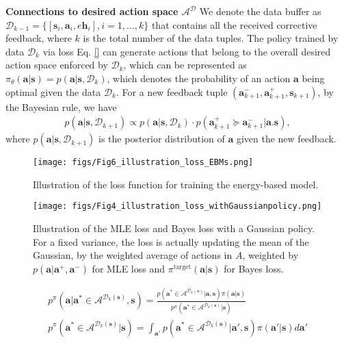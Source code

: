\textbf{Connections to desired action space $\mathcal{A}^{\mathcal{D}}$}
We denote the data buffer as $\mathcal{D}_{k-1} = \{[\bm s_i, \bm a_i, e \bm h_i], i = 1, \dots, k \}$ that contains all the received corrective feedback, where $k$ is the total number of the data tuples. 
The policy trained by data $\mathcal{D}_{k}$ 
 via loss Eq. \eqref{} can generate actions that belong to the overall desired action space enforced by $\mathcal{D}_{k}$, which can be represented as $ \pi_{\theta}(\bm a | \bm s) =p (\bm a | \bm s, \mathcal{D}_{k})$, which denotes the probability of an action $\bm a$ being optimal given the data $ \mathcal{D}_{k}$.
For a new feedback tuple $(\bm a^-_{k+1}, \bm a^+_{k+1}, \bm s_{k+1})$, by the Bayesian rule, we have
\begin{align}
    p (\bm a | \bm s, \mathcal{D}_{k+1}) \propto p (\bm a | \bm s, \mathcal{D}_{k}) \cdot p( \bm a^{+}_{k+1} \succeq \bm a^{-}_{k+1} | \bm a. \bm s),
\end{align}
where $p (\bm a | \bm s, \mathcal{D}_{k+1})$ is the posterior distribution of $\bm a$ given the new feedback. 


\begin{figure}
    \centering
    \texttt{[image: figs/Fig6\_illustration\_loss\_EBMs.png]}
	\caption{Illustration of the loss function for training the energy-based model.}
 \label{fig:Fig6_illustration_loss_EBMs}
\end{figure}


\begin{figure}
    \centering
    \texttt{[image: figs/Fig4\_illustration\_loss\_withGaussianpolicy.png]}
	\caption{Illustration of the MLE loss and Bayes loss with a Gaussian policy. For a fixed variance, the loss is actually updating the mean of the Gaussian, by the weighted average of actions in $A$, weighted by $p (\bm a|\bm a^{+},  \bm a^{-})$ for MLE loss and $\pi^{\text{target}}(\bm a | \bm s)$  for Bayes loss. }
 \label{fig:Fig4_illustration_loss_withGaussianpolicy}
\end{figure}


\begin{align}
p^{\pi} ( \bm a |  \bm a^* \in \mathcal{A}^{\mathcal{D}_k(\bm s)},  \bm s) =\frac{ p (\bm a^* \in \mathcal{A}^{\mathcal{D}_k(\bm s)} | \bm a ,\bm s) \pi(\bm a | \bm s)}{p^\pi (\bm a^* \in \mathcal{A}^{\mathcal{D}_k(\bm s)} | \bm s)} \\
    p^{\pi} (\bm a^* \in \mathcal{A}^{\mathcal{D}_k(\bm s)} | \bm s) = \int_{\bm a'} p (\bm a^* \in \mathcal{A}^{\mathcal{D}_k(\bm s)}| \bm a', \bm s) \pi(\bm a'  | \bm s) d \bm a'
\end{align}

